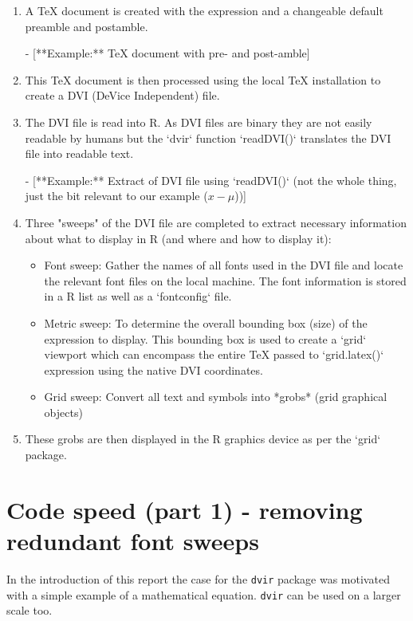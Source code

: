 \documentclass[]{article}
\begin{document}
\begin{enumerate}
  \item A \TeX{} document is created with the expression and a changeable default preamble and postamble.

  - [**Example:** TeX document with pre- and post-amble]
  
  \item This TeX document is then processed using the local \TeX{} installation to create a DVI (DeVice Independent) file.
  
  \item The DVI file is read into R. As DVI files are binary they are not easily readable by humans but the `dvir` function `readDVI()` translates the DVI file into readable text.

  - [**Example:** Extract of DVI file using `readDVI()` (not the whole thing, just the bit relevant to our example ($x - \mu$))]
  
  \item Three "sweeps" of the DVI file are completed to extract necessary information about what to display in R (and where and how to display it):
  \begin{itemize}
    \item Font sweep: Gather the names of all fonts used in the DVI file and locate the relevant font files on the local machine. The font information is stored in a R list as well as a `fontconfig` file.
    \item Metric sweep: To determine the overall bounding box (size) of the expression to display. This bounding box is used to create a `grid` viewport which can encompass the entire \TeX{} passed to `grid.latex()` expression using the native DVI coordinates.
    \item Grid sweep: Convert all text and symbols into *grobs* (grid graphical objects) 
  \end{itemize}
  \item These grobs are then displayed in the R graphics device as per the `grid` package.
\end{enumerate}

\newpage{}

\section{Code speed (part 1) - removing redundant font
sweeps}\label{code-speed-part-1---removing-redundant-font-sweeps}

In the introduction of this report the case for the \texttt{dvir}
package was motivated with a simple example of a mathematical equation.
\texttt{dvir} can be used on a larger scale too.
\end{document}
